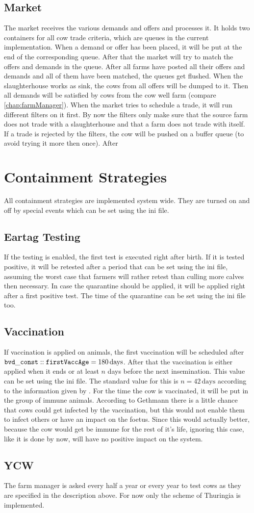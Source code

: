 \subsection{Market}
The market receives the various demands and offers and processes it. It holds two containers for all cow trade criteria, which are queues in the current implementation. When a demand or offer has been placed, it will be put at the end of the corresponding queue. After that the market will try to match the offers and demands in the queue. After all farms have posted all their offers and demands and all of them have been matched, the queues get flushed. When the slaughterhouse works as sink, the cows from all offers will be dumped to it. Then all demands will be satisfied by cows from the cow well farm (compare \ref{chap:farmManager}). When the market tries to schedule a trade, it will run different filters on it first. By now the filters only make sure that the source farm does not trade with a slaughterhouse and that a farm does not trade with itself. If a trade is rejected by the filters, the cow will be pushed on a buffer queue (to avoid trying it more then once). After 
\section{Containment Strategies}
All containment strategies are implemented system wide. They are turned on and off by special events which can be set using the ini file. 
\subsection{Eartag Testing}
If the testing is enabled, the first test is executed right after birth. If it is tested positive, it will be retested after a period that can be set using the ini file, assuming the worst case that farmers will rather retest than culling more calves then necessary. In case the quarantine should be applied, it will be applied right after a first positive test. The time of the quarantine can be set using the ini file too. 
\subsection{Vaccination}
If vaccination is applied on animals, the first vaccination will be scheduled after ${\tt bvd\_const::firstVaccAge}= 180\,\text{days}$. After that the vaccination is either applied when it ends or at least $n$ days before the next insemination. This value can be set using the ini file. The standard value for this is $n=42\,\text{days}$ according to the information given by \citep{personalCom}. For the time the cow is vaccinated, it will be put in the group of immune animals. According to Gethmann there is a little chance that cows could get infected by the vaccination, but this would not enable them to infect others or have an impact on the foetus. Since this would actually better, because the cow would get be immune for the rest of it's life, ignoring this case, like it is done by now, will have no positive impact on the system.
\subsection{YCW}
The farm manager is asked every half a year or every year to test cows as they are specified in the description above. For now only the scheme of Thuringia is implemented. 